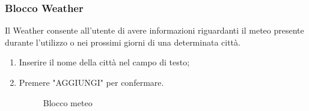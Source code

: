 \subsubsection{Blocco Weather}
\label{Blocchi}
Il Weather consente all'utente di avere informazioni riguardanti il meteo presente durante  l'utilizzo o nei prossimi giorni di una determinata città.
\begin{enumerate}
	\item Inserire il nome della città nel campo di testo;
	\item Premere "AGGIUNGI" per confermare.
	\begin{figure}[!ht]
		\centering
		\caption{Blocco meteo}
	\end{figure}
\end{enumerate}
\newpage

